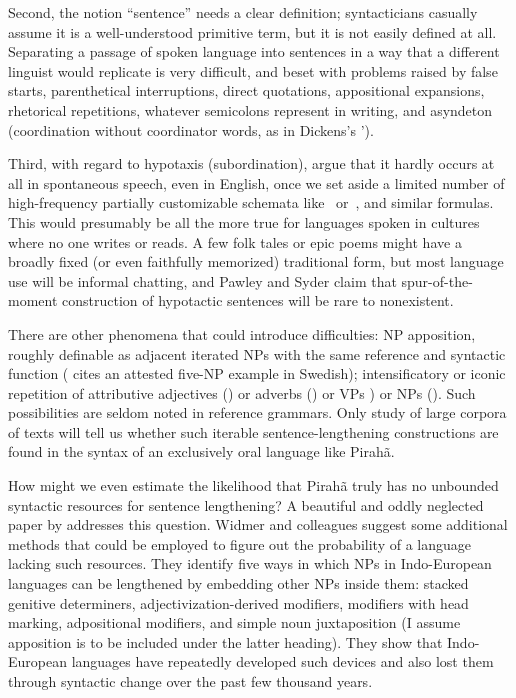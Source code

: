 \documentclass[output=paper,colorlinks,citecolor=brown
]{langscibook}
\begin{document}
Second, the notion ``sentence'' needs a clear definition; syntacticians
casually assume it is a well-understood primitive term, but it is not
easily defined at all. Separating a passage of spoken language into
sentences in a way that a different linguist would replicate is very
difficult, and beset with problems raised by false starts,
parenthetical interruptions, direct quotations, appositional
expansions, rhetorical repetitions, whatever semicolons represent in
writing, and asyndeton (coordination without coordinator words, as
in Dickens's ').

Third, with regard to hypotaxis (subordination), \citet{PawlSyde00}
argue that it hardly occurs at all in spontaneous speech, even in
English, once we set aside a limited number of high-frequency partially
customizable schemata like \, or \,, and similar formulas. This would presumably be all
the more true for languages spoken in cultures where no one writes
or reads. A few folk tales or epic poems might have a broadly fixed
(or even faithfully memorized) traditional form, but most language
use will be informal chatting, and Pawley and Syder claim that
spur-of-the-moment construction of hypotactic sentences will be rare
to nonexistent.

There are other phenomena that could introduce difficulties: NP
apposition, roughly definable as adjacent iterated NPs with the same
reference and syntactic function (\citealt{Karlsson10} cites an
attested five-NP example in Swedish); intensificatory or iconic
repetition of attributive adjectives ()
or adverbs () or VPs ) or NPs (). Such possibilities are seldom noted
in reference grammars. Only study of large corpora of texts will tell
us whether such iterable sentence-lengthening constructions are found
in the syntax of an exclusively oral language like Pirah{\~a}.

\begin{sloppypar}
How might we even estimate the likelihood that Pirah{\~a} truly has no
unbounded syntactic resources for sentence lengthening? A beautiful
and oddly neglected paper by \citet{WidmerEtAl17} addresses this
question. Widmer and colleagues suggest some additional methods that
could be employed to figure out the probability of a language lacking
such resources. They identify five ways in which NPs in Indo-European
languages can be lengthened by embedding other NPs inside them: stacked
genitive determiners, adjectivization-derived modifiers, modifiers
with head marking, adpositional modifiers, and simple noun
juxtaposition (I assume apposition is to be included under the latter
heading). They show that Indo-European languages have repeatedly
developed such devices and also lost them through syntactic change
over the past few thousand years.
\end{sloppypar}
\end{document}
